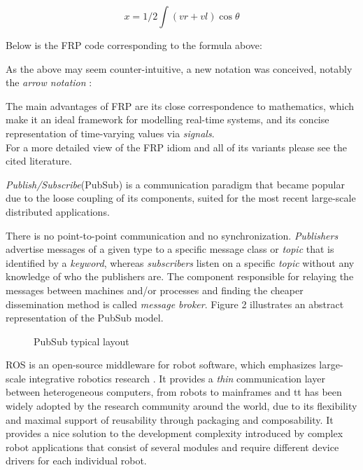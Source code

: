 \documentclass{dithesis}
\begin{document}
$$ x = 1/2 \int (vr + vl) \cos\theta $$ 

Below is the FRP code corresponding to the formula above:


As the above may seem counter-intuitive, a new notation was conceived, notably the \textit{arrow notation} \cite{arrows_notation}:


The main advantages of FRP are its close correspondence to mathematics, which make it an ideal framework for modelling real-time systems, and its concise representation of time-varying values via \textit{signals}. \\
For a more detailed view of the FRP idiom and all of its variants please see the cited literature.


\textit{Publish/Subscribe}(PubSub) is a communication paradigm that became popular due to the loose coupling of its components, suited for the most recent large-scale distributed applications.

There is no point-to-point communication and no synchronization. \textit{Publishers} advertise messages of a given type to a specific message class or \textit{topic} that is identified by a \textit{keyword}, whereas \textit{subscribers} listen on a specific \textit{topic} without any knowledge of who the publishers are. The component responsible for relaying the messages between machines and/or processes and finding the cheaper dissemination method is called \textit{message broker}. Figure 2 illustrates an abstract representation of the PubSub model.

\begin{figure}[h!] \begin{center}    
  	 
  	\caption{PubSub typical layout}
\end{center} \end{figure}


ROS is an open-source middleware for robot software, which emphasizes large-scale integrative robotics research \cite{ROS}. It provides a \textit{thin} communication layer between heterogeneous computers, from robots to mainframes and tt has been widely adopted by the research community around the world, due to its flexibility and maximal support of reusability through packaging and composability. It provides a nice solution to the development complexity introduced by complex robot applications that consist of several modules and require different device drivers for each individual robot. 
\end{document}

